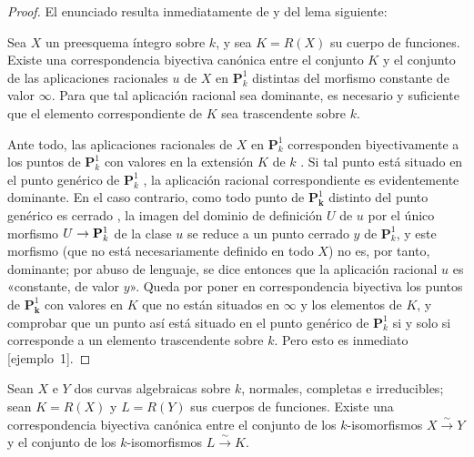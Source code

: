 \documentclass[oneside,10pt]{amsart}
\makeatletter
\newcommand{\ega@arrow}[2]{\mathchoice{#1}{#2}{#2}{#2}}
\renewcommand{\to}{\ega@arrow{\longrightarrow}{\rightarrow}}
\newcommand{\oldpage}[2][]{\marginnote{\normalfont\footnotesize\textbf{#1}~|~#2}\ignorespaces}
\let\EGAOriginalLabel\label
\renewcommand{\label}[1]{\phantomsection\EGAOriginalLabel{#1}}
\makeatother
\begin{document}
\begin{proof}
El enunciado resulta inmediatamente de  y del lema siguiente:
\begin{lemma}[7.4.15.1]
\label{II.7.4.15.1-fr}
Sea $X$ un preesquema íntegro sobre $k$, y sea $K=R(X)$ su cuerpo de funciones.
Existe una correspondencia biyectiva canónica entre el conjunto $K$ y el conjunto de las aplicaciones racionales $u$ de $X$ en $\mathbf{P}_k^1$ distintas del morfismo constante de valor $\infty$.
Para que tal aplicación racional sea dominante, es necesario y suficiente que el elemento correspondiente de $K$ sea trascendente sobre $k$.
\end{lemma}
Ante todo, las aplicaciones racionales de $X$ en $\mathbf{P}_k^1$ corresponden biyectivamente a los puntos de $\mathbf{P}_k^1$ con valores en la extensión $K$ de $k$ .
Si tal punto está situado en el punto genérico de $\mathbf{P}_k^1$ , la aplicación racional correspondiente es evidentemente dominante.
En el caso contrario, como todo punto de $\mathbf{P}_{\boldsymbol{k}}^1$ distinto del punto genérico es cerrado , la imagen del dominio de definición $U$ de $u$ por el único morfismo $U\to\mathbf{P}_k^1$ de la clase $u$  se reduce a un punto cerrado $y$ de $\mathbf{P}_k^1$, y este morfismo (que no está necesariamente definido en todo $X$) no es, por tanto, dominante;
por abuso de lenguaje, se dice entonces que la aplicación racional $u$ es «constante, de valor $y$».
Queda por poner en correspondencia biyectiva los puntos de $\mathbf{P}_{\boldsymbol{k}}^1$ con valores en $K$ que no están situados en $\infty$  y los elementos de $K$, y comprobar que un punto así está situado en el punto genérico de $\mathbf{P}_k^1$ si y solo si corresponde a un
\oldpage[II]{152}
elemento trascendente sobre $k$.
Pero esto es inmediato [ejemplo~1].
\end{proof}

\begin{corollary}[7.4.16]
\label{II.7.4.16-fr}
Sean $X$ e $Y$ dos curvas algebraicas sobre $k$, \textup{normales, completas} e irreducibles;
sean $K=R(X)$ y $L=R(Y)$ sus cuerpos de funciones.
Existe una correspondencia biyectiva canónica entre el conjunto de los $k$-isomorfismos $X\xrightarrow{\sim}Y$ y el conjunto de los $k$-isomorfismos $L\xrightarrow{\sim}K$.
\end{corollary}
\end{document}
